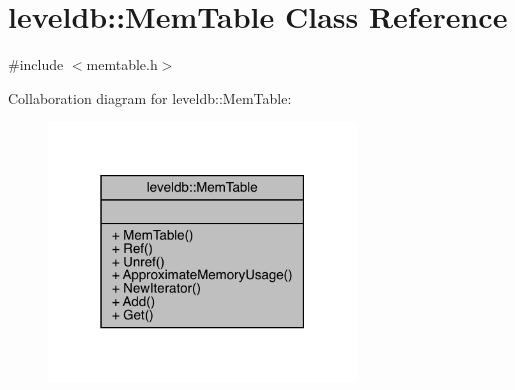 \hypertarget{classleveldb_1_1_mem_table}{}\section{leveldb\+::Mem\+Table Class Reference}
\label{classleveldb_1_1_mem_table}


{\ttfamily \#include $<$memtable.\+h$>$}



Collaboration diagram for leveldb\+::Mem\+Table\+:
\nopagebreak
\begin{figure}[H]
\begin{center}
\leavevmode
\includegraphics[width=232pt]{classleveldb_1_1_mem_table__coll__graph}
\end{center}
\end{figure}
